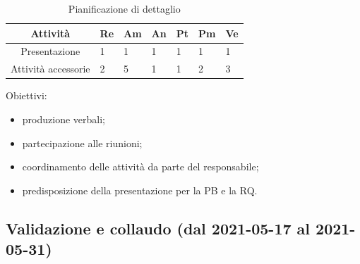 \begin{table}[H]
	\centering
	\renewcommand{\arraystretch}{1.5}
	\begin{tabular}{|c|p{10mm}|p{10mm}|p{10mm}|p{10mm}|p{10mm}|p{10mm}|}
		\hline
		\rowcolor{lighter-grayer}
		\textbf{Attività}                         & \textbf{Re} & \textbf{Am} & \textbf{An} & \textbf{Pt} & \textbf{Pm} & \textbf{Ve} \\ \hline
		
		Presentazione       & 1           & 1           & 1           & 1           & 1           & 1           \\ \hline
		Attività accessorie & 2           & 5           & 1           & 1           & 2           & 3           \\ \hline
		
	\end{tabular}
	\caption{ Pianificazione di dettaglio\\}
\end{table}

Obiettivi:
\begin{itemize}
	\item produzione verbali;
	\item partecipazione alle riunioni;
	\item coordinamento delle attività da parte del responsabile;
	\item predisposizione della presentazione per la PB e la RQ.
\end{itemize}

\subsection{Validazione e collaudo (dal 2021-05-17 al 2021-05-31)}

